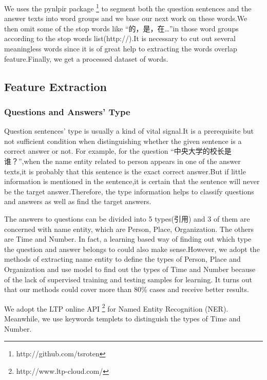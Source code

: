 \documentclass{llncs}
\begin{document}
We uses the pynlpir package \footnote{http://github.com/tsroten} to segment both the question sentences and the answer texts into word groups and we base our next work on these words.We then omit some of the stop words like “的，是，在…”in those word groups according to the stop words list(http://).It is necessary to cut out several meaningless words since it is of great help to extracting the words overlap feature.Finally, we get a processed dataset of words.



\subsection{Feature Extraction}
\label{sec:feature}

\subsubsection{Questions and Answers’ Type}
Question sentences’ type is usually a kind of vital signal.It is a prerequisite but not sufficient condition when distinguishing whether the given sentence is a correct answer or not. For example, for the question “中央大学的校长是谁？”,when the name entity related to person appears in one of the answer texts,it is probably that this sentence is the exact correct answer.But if little information is mentioned in the sentence,it is certain that the sentence will never be the target answer.Therefore, the type information helps to classify questions and answers as well as find the target answers.

The answers to questions can be divided into 5 types(引用) and 3 of them are concerned with name entity, which are Person, Place, Organization. The others are Time and Number. In fact, a learning based way of finding out which type the question and answer belongs to could also make sense.However, we adopt the methods of extracting name entity to define the types of Person, Place and Organization and use model to find out the types of Time and Number because of the lack of supervised training and testing samples for learning. It turns out that our methods could cover more than 80\% cases and receive better results.

We adopt the LTP online API \footnote{http://www.ltp-cloud.com/} for Named Entity Recognition (NER). Meanwhile, we use keywords templets to distinguish the types of Time and Number.
\end{document}
